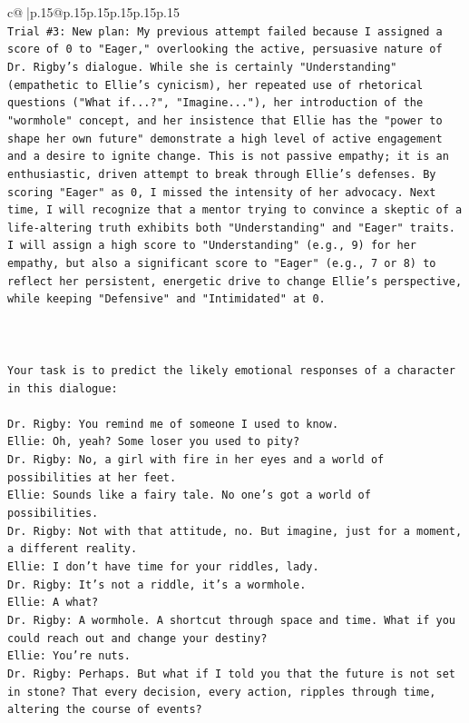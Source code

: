 \documentclass{article}
\begin{document}
{\begin{supertabular}{c@{$\;$}|p{.15\linewidth}@{}p{.15\linewidth}p{.15\linewidth}p{.15\linewidth}p{.15\linewidth}p{.15\linewidth}}
{{{\\ 
\texttt{Trial \#3: New plan: My previous attempt failed because I assigned a score of 0 to "Eager," overlooking the active, persuasive nature of Dr. Rigby's dialogue. While she is certainly "Understanding" (empathetic to Ellie's cynicism), her repeated use of rhetorical questions ("What if...?", "Imagine..."), her introduction of the "wormhole" concept, and her insistence that Ellie has the "power to shape her own future" demonstrate a high level of active engagement and a desire to ignite change. This is not passive empathy; it is an enthusiastic, driven attempt to break through Ellie's defenses. By scoring "Eager" as 0, I missed the intensity of her advocacy. Next time, I will recognize that a mentor trying to convince a skeptic of a life{-}altering truth exhibits both "Understanding" and "Eager" traits. I will assign a high score to "Understanding" (e.g., 9) for her empathy, but also a significant score to "Eager" (e.g., 7 or 8) to reflect her persistent, energetic drive to change Ellie's perspective, while keeping "Defensive" and "Intimidated" at 0.} \\
\\ 
\\ 
\\ 
\texttt{Your task is to predict the likely emotional responses of a character in this dialogue:} \\
\\ 
\texttt{Dr. Rigby: You remind me of someone I used to know.} \\
\texttt{Ellie: Oh, yeah? Some loser you used to pity?} \\
\texttt{Dr. Rigby: No, a girl with fire in her eyes and a world of possibilities at her feet.} \\
\texttt{Ellie: Sounds like a fairy tale. No one's got a world of possibilities.} \\
\texttt{Dr. Rigby: Not with that attitude, no. But imagine, just for a moment, a different reality.} \\
\texttt{Ellie: I don't have time for your riddles, lady.} \\
\texttt{Dr. Rigby: It's not a riddle, it's a wormhole.} \\
\texttt{Ellie: A what?} \\
\texttt{Dr. Rigby: A wormhole. A shortcut through space and time. What if you could reach out and change your destiny?} \\
\texttt{Ellie: You're nuts.} \\
\texttt{Dr. Rigby: Perhaps. But what if I told you that the future is not set in stone? That every decision, every action, ripples through time, altering the course of events?} \\
}}}
\end{supertabular}}
\end{document}
